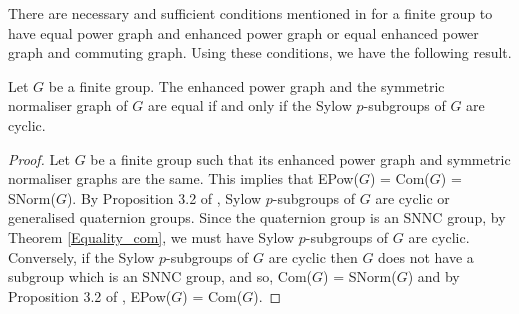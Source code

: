 There are necessary and sufficient conditions mentioned in \cite{PJC2022} for a finite group to have equal power graph and enhanced power graph or equal enhanced power graph and commuting graph. Using these conditions, we have the following result.
\begin{thm}\label{equality_others}
    Let $G$ be a finite group. The enhanced power graph and the symmetric normaliser graph of $G$ are equal if and only if the Sylow $p$-subgroups of $G$ are cyclic.
\end{thm}
\begin{proof}
    Let $G$ be a finite group such that its enhanced power graph and symmetric normaliser graphs are the same. This implies that EPow($G$) = Com($G$) = SNorm($G$). By Proposition 3.2 of \cite{PJC2022}, Sylow $p$-subgroups of $G$ are cyclic or generalised quaternion groups. Since the quaternion group is an SNNC group, by Theorem \ref{Equality_com}, we must have Sylow $p$-subgroups of $G$ are cyclic. Conversely, if the Sylow $p$-subgroups of $G$ are cyclic then $G$ does not have a subgroup which is an SNNC group, and so, Com($G$) = SNorm($G$) and by Proposition 3.2 of \cite{PJC2022}, EPow($G$) = Com($G$). 
 \end{proof}

